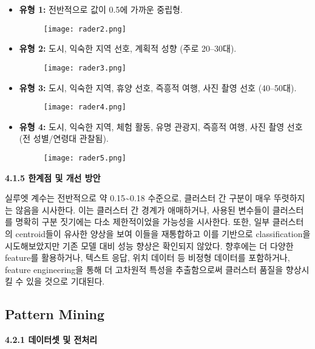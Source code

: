 \documentclass[sigconf]{acmart}
\begin{document}
\begin{CJK}{UTF8}{mj}
\begin{itemize}
  \item \textbf{유형 1:} 전반적으로 값이 0.5에 가까운 중립형.
    \begin{figure}[H]
    \centering
    \texttt{[image: rader2.png]}
    \label{fig:pca_all}
    \end{figure}
  \item \textbf{유형 2:} 도시, 익숙한 지역 선호, 계획적 성향 (주로 20–30대).
    \begin{figure}[H]
    \centering
    \texttt{[image: rader3.png]}
    \label{fig:pca_all}
    \end{figure}
  \item \textbf{유형 3:} 도시, 익숙한 지역, 휴양 선호, 즉흥적 여행, 사진 촬영 선호 (40–50대).
    \begin{figure}[H]
    \centering
    \texttt{[image: rader4.png]}
    \label{fig:pca_all}
    \end{figure}
  \item \textbf{유형 4:} 도시, 익숙한 지역, 체험 활동, 유명 관광지, 즉흥적 여행, 사진 촬영 선호 (전 성별/연령대 관찰됨).
    \begin{figure}[H]
    \centering
    \texttt{[image: rader5.png]}
    \label{fig:pca_all}
    \end{figure}
\end{itemize}

\noindent\textbf{4.1.5 한계점 및 개선 방안}\par
실루엣 계수는 전반적으로 약 0.15\textasciitilde{}0.18 수준으로, 클러스터 간 구분이 매우 뚜렷하지는 않음을 시사한다. 이는 클러스터 간 경계가 애매하거나, 사용된 변수들이 클러스터를 명확히 구분 짓기에는 다소 제한적이었을 가능성을 시사한다. 
또한, 일부 클러스터의 centroid들이 유사한 양상을 보여 이들을 재통합하고 이를 기반으로 classification을 시도해보았지만 기존 모델 대비 성능 향상은 확인되지 않았다.
향후에는 더 다양한 feature를 활용하거나, 텍스트 응답, 위치 데이터 등 비정형 데이터를 포함하거나, feature engineering을 통해 더 고차원적 특성을 추출함으로써 클러스터 품질을 향상시킬 수 있을 것으로 기대된다.



\subsection{Pattern Mining}

\noindent\textbf{4.2.1 데이터셋 및 전처리}\par


\end{CJK}
\end{document}
